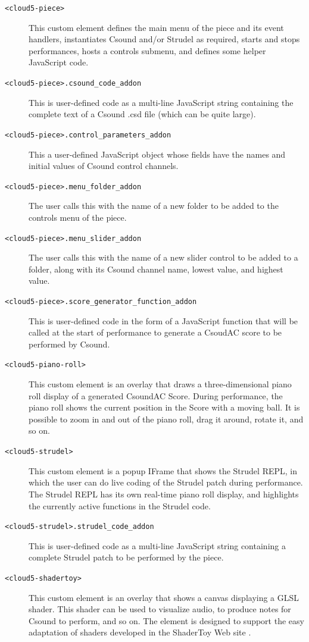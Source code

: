 \documentclass[runningheads,a4paper]{llncs}
\begin{document}
\begin{description}
\item[\texttt{<cloud5-piece>}] This custom element defines the main menu of the piece and its event handlers, instantiates Csound and/or Strudel as required, starts and stops performances, hosts a controls submenu, and defines some helper JavaScript code.
\item[\texttt{<cloud5-piece>.csound\_code\_addon}]  This is user-defined code as a multi-line JavaScript string containing the complete text of a Csound .csd file (which can be quite large).
\item[\texttt{<cloud5-piece>.control\_parameters\_addon}]  This a user-defined JavaScript object whose fields have the names and initial values of Csound control channels.
\item[\texttt{<cloud5-piece>.menu\_folder\_addon}]  The user calls this with the name of a new folder to be added to the controls menu of the piece.
\item[\texttt{<cloud5-piece>.menu\_slider\_addon}]  The user calls this with the name of a new slider control to be added to a folder, along with its Csound channel name, lowest value, and highest value.
\item[\texttt{<cloud5-piece>.score\_generator\_function\_addon}]  This is user-defined code in the form of a JavaScript function that will be called at the start of performance to generate a CsoudAC score to be performed by Csound. 
\item[\texttt{<cloud5-piano-roll>}] This custom element is an overlay that draws a three-dimensional piano roll display of a generated CsoundAC Score. During performance, the piano roll shows the current position in the Score with a moving ball. It is possible to zoom in and out of the piano roll, drag it around, rotate it, and so on.
\item[\texttt{<cloud5-strudel>}] This custom element is a popup IFrame that shows the Strudel REPL, in which the user can do live coding of the Strudel patch during performance. The Strudel REPL has its own real-time piano roll display, and highlights the currently active functions in the Strudel code.
\item[\texttt{<cloud5-strudel>.strudel\_code\_addon}] This is user-defined code as a multi-line JavaScript string containing a complete Strudel patch to be performed by the piece.
\item[\texttt{<cloud5-shadertoy>}] This  custom element is an overlay that shows a canvas displaying a GLSL shader. This shader can be used to visualize audio, to produce notes for Csound to perform, and so on. The element is designed to support the easy adaptation of shaders developed in the ShaderToy Web site \cite{shadertoy}.

\end{description}
\end{document}
